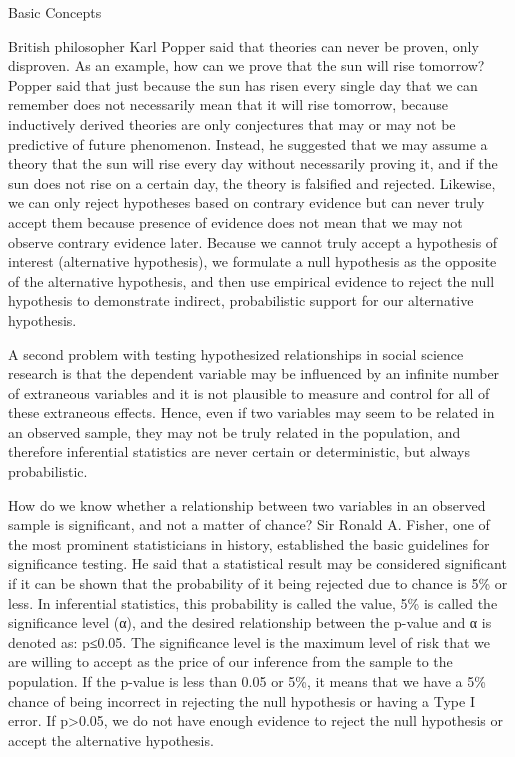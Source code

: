 Basic Concepts

British philosopher Karl Popper said that theories can never be proven, only disproven. As an example, how can we prove that the sun will rise tomorrow? Popper said that just because the sun has risen every single day that we can remember does not necessarily mean that it will rise tomorrow, because inductively derived theories are only conjectures that may or may not be predictive of future phenomenon. Instead, he suggested that we may assume a theory that the sun will rise every day without necessarily proving it, and if the sun does not rise on a certain day, the theory is falsified and rejected. Likewise, we can only reject hypotheses based on contrary evidence but can never truly accept them because presence of evidence does not mean that we may not observe contrary evidence later. Because we cannot truly accept a hypothesis of interest (alternative hypothesis), we formulate a null hypothesis as the opposite of the alternative hypothesis, and then use empirical evidence to reject the null hypothesis to demonstrate indirect, probabilistic support for our alternative hypothesis. 

A second problem with testing hypothesized relationships in social science research is that the dependent variable may be influenced by an infinite number of extraneous variables and it is not plausible to measure and control for all of these extraneous effects. Hence, even if two variables may seem to be related in an observed sample, they may not be truly related in the population, and therefore inferential statistics are never certain or deterministic, but always probabilistic.

How do we know whether a relationship between two variables in an observed sample is significant, and not a matter of chance? Sir Ronald A. Fisher, one of the most prominent statisticians in history, established the basic guidelines for significance testing. He said that a statistical result may be considered significant if it can be shown that the probability of it being rejected due to chance is 5\% or less. In inferential statistics, this probability is called the value, 5\% is called the significance level (α), and the desired relationship between the p-value and α is denoted as: p≤0.05. The significance level is the maximum level of risk that we are willing to accept as the price of our inference from the sample to the population. If the p-value is less than 0.05 or 5\%, it means that we have a 5\% chance of being incorrect in rejecting the null hypothesis or having a Type I error. If p>0.05, we do not have enough evidence to reject the null hypothesis or accept the alternative hypothesis. 

